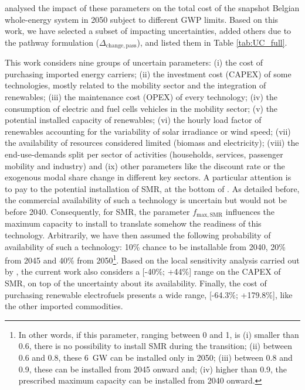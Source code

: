 \citet{rixhon2021role} analysed the impact of these parameters on the total cost of the snapshot Belgian whole-energy system in 2050 subject to different \gls{GWP} limits. Based on this work, we have selected a subset of impacting uncertainties, added others due to the pathway formulation (\eg $\Delta_{\mathrm{change,pass}}$), and listed them in Table \ref{tab:UC_full}.

This work considers nine groups of uncertain parameters: (i) the cost of purchasing imported energy carriers; (ii) the investment cost (\ie CAPEX) of some technologies, mostly related to the mobility sector and the integration of renewables; (iii) the maintenance cost (\ie OPEX) of every technology; (iv) the consumption of electric and fuel cells vehicles in the mobility sector; (v) the potential installed capacity of renewables; (vi) the hourly load factor of renewables accounting for the variability of solar irradiance or wind speed; (vii) the availability of resources considered limited (\ie biomass and electricity); (viii) the end-use-demands split per sector of activities (\ie households, services, passenger mobility and industry) and (ix) other parameters like the discount rate or the exogenous modal share change in different key sectors. A particular attention is to pay to the potential installation of \gls{SMR}, at the bottom of . As detailed before, the commercial availability of such a technology is uncertain but would not be before 2040. Consequently, for \gls{SMR}, the parameter $f_{\mathrm{max,SMR}}$ influences the maximum capacity to install to translate somehow the readiness of this technology. Arbitrarily, we have then assumed the following probability of availability of such a technology: 10\% chance to be installable from 2040, 20\% from 2045 and 40\% from 2050\footnote{In other words, if this parameter, ranging between 0 and 1, is (i) smaller than 0.6, there is no possibility to install \gls{SMR} during the transition; (ii) between 0.6 and 0.8, these 6~GW can be installed only in 2050; (iii) between 0.8 and 0.9, these can be installed from 2045 onward and; (iv) higher than 0.9, the prescribed maximum capacity can be installed from 2040 onward. }. Based on the local sensitivity analysis carried out by \citet{PATHS2050}, the current work also considers a [-40\%; +44\%] range on the CAPEX of SMR, on top of the uncertainty about its availability. Finally, the cost of purchasing renewable electrofuels presents a wide range, [-64.3\%; +179.8\%], like the other imported commodities.

